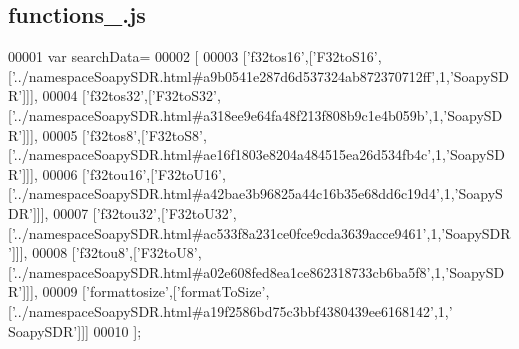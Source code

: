 \subsection{functions\+\_.\+js}
\label{functions__4_8js_source}

\begin{DoxyCode}
00001 var searchData=
00002 [
00003   [\textcolor{stringliteral}{'f32tos16'},[\textcolor{stringliteral}{'F32toS16'},[\textcolor{stringliteral}{'../namespaceSoapySDR.html#a9b0541e287d6d537324ab872370712ff'},1,\textcolor{stringliteral}{'SoapySDR'}]]],
00004   [\textcolor{stringliteral}{'f32tos32'},[\textcolor{stringliteral}{'F32toS32'},[\textcolor{stringliteral}{'../namespaceSoapySDR.html#a318ee9e64fa48f213f808b9c1e4b059b'},1,\textcolor{stringliteral}{'SoapySDR'}]]],
00005   [\textcolor{stringliteral}{'f32tos8'},[\textcolor{stringliteral}{'F32toS8'},[\textcolor{stringliteral}{'../namespaceSoapySDR.html#ae16f1803e8204a484515ea26d534fb4c'},1,\textcolor{stringliteral}{'SoapySDR'}]]],
00006   [\textcolor{stringliteral}{'f32tou16'},[\textcolor{stringliteral}{'F32toU16'},[\textcolor{stringliteral}{'../namespaceSoapySDR.html#a42bae3b96825a44c16b35e68dd6c19d4'},1,\textcolor{stringliteral}{'SoapySDR'}]]],
00007   [\textcolor{stringliteral}{'f32tou32'},[\textcolor{stringliteral}{'F32toU32'},[\textcolor{stringliteral}{'../namespaceSoapySDR.html#ac533f8a231ce0fce9cda3639acce9461'},1,\textcolor{stringliteral}{'SoapySDR'}]]],
00008   [\textcolor{stringliteral}{'f32tou8'},[\textcolor{stringliteral}{'F32toU8'},[\textcolor{stringliteral}{'../namespaceSoapySDR.html#a02e608fed8ea1ce862318733cb6ba5f8'},1,\textcolor{stringliteral}{'SoapySDR'}]]],
00009   [\textcolor{stringliteral}{'formattosize'},[\textcolor{stringliteral}{'formatToSize'},[\textcolor{stringliteral}{'../namespaceSoapySDR.html#a19f2586bd75c3bbf4380439ee6168142'},1,\textcolor{stringliteral}{'
      SoapySDR'}]]]
00010 ];
\end{DoxyCode}
